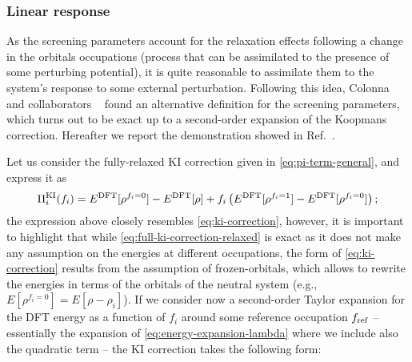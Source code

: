 \subsubsection*{Linear response}
As the screening parameters account for the relaxation effects following a change in the orbitals occupations (process that can be assimilated to the presence of some perturbing potential), it is quite reasonable to assimilate them to the system's response to some external perturbation. Following this idea, Colonna and collaborators ~\cite{colonna_screening_2018} found an alternative definition for the screening parameters, which turns out to be exact up to a second-order expansion of the Koopmans correction. Hereafter we report the demonstration showed in Ref.~\cite{colonna_screening_2018}.

Let us consider the fully-relaxed KI correction given in \cref{eq:pi-term-general}, and express it as
%
\begin{equation}
    \Pi_i^{\rm KI}(f_i) = E^{\rm DFT}[\rho^{f_i=0}] - E^{\rm DFT}[\rho] + f_i \left( E^{\rm DFT}[\rho^{f_i=1}] - E^{\rm DFT}[\rho^{f_i=0}] \right) ;
    \label{eq:full-ki-correction-relaxed}
\end{equation}
%
the expression above closely resembles \cref{eq:ki-correction}, however, it is important to highlight that while \cref{eq:full-ki-correction-relaxed} is exact as it does not make any assumption on the energies at different occupations, the form of \cref{eq:ki-correction} results from the assumption of frozen-orbitals, which allows to rewrite the energies in terms of the orbitals of the neutral system (e.g., $E[\rho^{f_i=0}] = E[\rho-\rho_i]$). If we consider now a second-order Taylor expansion for the DFT energy as a function of $f_i$ around some reference occupation $f_{\rm ref}$ -- essentially the expansion of \cref{eq:energy-expansion-lambda} where we include also the quadratic term -- the KI correction takes the following form:
%

